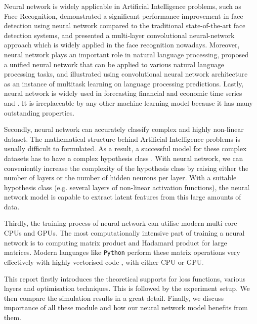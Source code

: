 Neural network is widely applicable in Artificial Intelligence problems, such as Face Recognition, \citet{655647} demonstrated a significant performance improvement in face detection using neural network compared to the traditional state-of-the-art face detection systems, and \citet{554195} presented a multi-layer convolutional neural-network approach which is widely applied in the face recognition nowadays.
Moreover, neural network plays an important role in natural language processing, \citet{Collobert:2011:NLP:1953048.2078186} proposed a unified neural network that can be applied to various natural language processing tasks, and \citet{Collobert:2008:UAN:1390156.1390177} illustrated using convolutional neural network architecture as an instance of multitask learning on language processing predictions.
Lastly, neural network is widely used in forecasting financial and economic time series \citep{KAASTRA1996215} and \citep{Azoff:1994:NNT:561452}.
It is irreplaceable by any other machine learning model because it has many outstanding properties. 


Secondly, neural network can accurately classify complex and highly non-linear dataset. The mathematical structure behind Artificial Intelligence problems is usually difficult to formulated. As a result, a successful model for these complex datasets has to have a complex hypothesis class \citep{Bishop:2006:PRM:1162264}. 
With neural network, we can conveniently increase the complexity of the hypothesis class by raising either the number of layers or the number of hidden neurons per layer. 
With a suitable hypothesis class (e.g. several layers of non-linear activation functions), the neural network model is capable to extract latent features from this large amounts of data.

Thirdly, the training process of neural network can utilise modern multi-core CPUs and GPUs. The most computationally intensive part of training a neural network is to computing matrix product and Hadamard product for large matrices. Modern languages like \texttt{Python} perform these matrix operations very effectively with highly vectorised code \citep{5725236}, with either CPU or GPU.

This report firstly introduces the theoretical supports for loss functions, various layers and optimisation techniques. 
This is followed by the experiment setup. We then compare the simulation results in a great detail.
Finally, we discuss importance of all these module and how our neural network model benefits from them.
